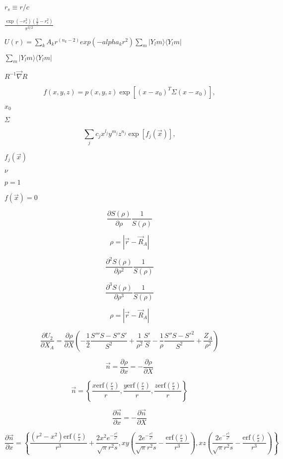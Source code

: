 \documentclass{article}
\begin{document}
$ r_s \equiv r/c $
\pagebreak

$ \frac{\exp(-r_s^2) \left(\frac{5}{2}- r_s^2 \right)}{\pi^{3/2}} $
\pagebreak

$  U(r) = \sum_k A_k r^(n_k-2) exp(-alpha_k r^2) \sum_m |Y_lm \rangle \langle Y_lm| $
\pagebreak

$\sum_m |Y_lm \rangle \langle Y_lm|$
\pagebreak

$R^{-1} \vec\nabla R$
\pagebreak

\[
f(x,y,z) = p(x,y,z) \exp[(x-x_0)^T \Sigma (x-x_0)],
\]
\pagebreak

$x_0$
\pagebreak

$\Sigma$
\pagebreak

\[
\sum_j c_j x^{l_j} y^{m_j} z^{n_j} \exp[f_j(\vec{x})],
\]
\pagebreak

$f_j(\vec{x})$
\pagebreak

$\nu$
\pagebreak

$p=1$
\pagebreak

$f(\vec{x})=0$
\pagebreak

\[
    \frac{\partial S(\rho)}{\partial \rho} \frac{1}{S(\rho)}
\]
\pagebreak

\[
   \rho = |\vec r - \vec R_A |
\]
\pagebreak

\[
    \frac{\partial^2 S(\rho)}{\partial \rho^2} \frac{1}{S(\rho)}
\]
\pagebreak

\[
    \frac{\partial^3 S(\rho)}{\partial \rho^3} \frac{1}{S(\rho)}
\]
\pagebreak

\[
  \rho = \left| \vec r- \vec R_A \right|
\]
\pagebreak

\[
\frac{\partial U_2}{\partial X_A} = \frac{\partial \rho}{\partial X}
          \left(-\frac{1}{2}\frac{S''' S - S'' S'}{S^2} + \frac{1}{\rho^2}\frac{S'}{S}
          - \frac{1}{\rho} \frac{S''S - S'^2}{S^2} + \frac{Z_A}{\rho^2}\right)
\]
\pagebreak

\[
    \vec n  = \frac{\partial \rho}{\partial x} = -\frac{\partial \rho}{\partial X}
\]
\pagebreak

\[
\vec n = \left\{\frac{x \mathrm{erf}\left(\frac{r}{s}\right)}{r},
         \frac{y \mathrm{erf}\left(\frac{r}{s}\right)}{r},
         \frac{z \mathrm{erf}\left(\frac{r}{s}\right)}{r}\right\}
\]
\pagebreak

\[
    \frac{\partial \vec n}{\partial x}  = -\frac{\partial \vec n}{\partial X}
\]
\pagebreak

\[
\frac{\partial\vec n}{\partial x} =
\left\{\frac{\left(r^2-x^2\right) \mathrm{erf}\left(\frac{r}{s}\right)}{r^3}
   +\frac{2 x^2 e^{-\frac{r^2}{s^2}}}{\sqrt{\pi } r^2 s},
 x y \left(\frac{2 e^{-\frac{r^2}{s^2}}}{\sqrt{\pi } r^2 s}
   -\frac{\mathrm{erf}\left(\frac{r}{s}\right)}{r^3}\right),
 x z \left(\frac{2 e^{-\frac{r^2}{s^2}}}{\sqrt{\pi } r^2 s}
   -\frac{\mathrm{erf}\left(\frac{r}{s}\right)}{r^3}\right)\right\}
\]
\pagebreak
\end{document}
